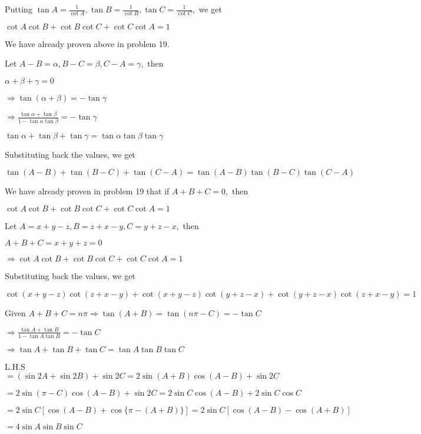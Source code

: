   Putting $\tan A = \frac{1}{\cot A}, \tan B = \frac{1}{\cot B}, \tan C = \frac{1}{\cot C},$ we get

  $\cot A\cot B + \cot B\cot C + \cot C\cot A = 1$

  We have already proven above in problem 19.

\item Let $A - B = \alpha, B - C = \beta, C - A = \gamma,$ then

  $\alpha + \beta + \gamma = 0$

  $\Rightarrow \tan(\alpha + \beta) = -\tan\gamma$

  $\Rightarrow \frac{\tan\alpha + \tan\beta}{1 - \tan\alpha\tan\beta} = -\tan\gamma$

  $\tan\alpha + \tan\beta + \tan\gamma = \tan\alpha\tan\beta\tan\gamma$

  Substituting back the values, we get

  $\tan(A - B) + \tan(B - C) + \tan(C - A) = \tan(A - B)\tan(B - C)\tan(C - A)$

\item We have already proven in problem 19 that if $A + B + C = 0,$ then

  $\cot A\cot B + \cot B\cot C + \cot C\cot A = 1$

  Let $A = x + y - z, B = z + x - y, C = y + z - x,$ then

  $A + B + C = x + y + z = 0$

  $\Rightarrow \cot A\cot B + \cot B\cot C + \cot C\cot A = 1$

  Substituting back the values, we get

  $\cot(x + y - z)\cot(z + x - y) + \cot(x + y - z)\cot(y + z - x) + \cot(y + z - x)\cot(z + x - y) = 1$

\item Given $A + B + C= n\pi \Rightarrow \tan(A + B) = \tan(n\pi - C) = -\tan C$

  $\Rightarrow \frac{\tan A + \tan B}{1 - \tan A\tan B} = -\tan C$

  $\Rightarrow \tan A + \tan B + \tan C = \tan A\tan B\tan C$

\item L.H.S $= (\sin2A + \sin2B) + \sin2C = 2\sin(A + B)\cos(A - B) + \sin2C$

  $= 2\sin(\pi - C)\cos(A - B) + \sin2C = 2\sin C\cos(A - B) + 2\sin C\cos C$

  $= 2\sin C[\cos(A - B) + \cos\{\pi - (A + B)\}] = 2\sin C[\cos(A - B) - \cos(A + B)]$

  $= 4\sin A\sin B\sin C$

